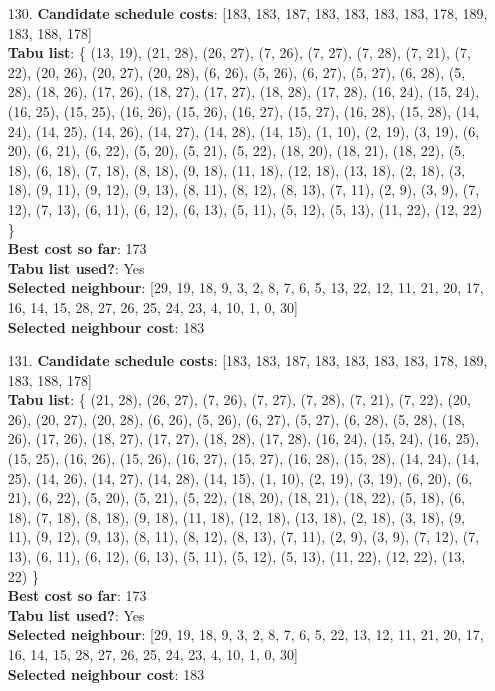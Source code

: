 \documentclass[fleqn]{article}
\begin{document}
\begin{itemize}
    \item[130.] \textbf{Candidate schedule costs}: [183, 183, 187, 183, 183, 183, 183, 178, 189, 183, 188, 178] \\
    \textbf{Tabu list}: \{ (13, 19), (21, 28), (26, 27), (7, 26), (7, 27), (7, 28), (7, 21), (7, 22), (20, 26), (20, 27), (20, 28), (6, 26), (5, 26), (6, 27), (5, 27), (6, 28), (5, 28), (18, 26), (17, 26), (18, 27), (17, 27), (18, 28), (17, 28), (16, 24), (15, 24), (16, 25), (15, 25), (16, 26), (15, 26), (16, 27), (15, 27), (16, 28), (15, 28), (14, 24), (14, 25), (14, 26), (14, 27), (14, 28), (14, 15), (1, 10), (2, 19), (3, 19), (6, 20), (6, 21), (6, 22), (5, 20), (5, 21), (5, 22), (18, 20), (18, 21), (18, 22), (5, 18), (6, 18), (7, 18), (8, 18), (9, 18), (11, 18), (12, 18), (13, 18), (2, 18), (3, 18), (9, 11), (9, 12), (9, 13), (8, 11), (8, 12), (8, 13), (7, 11), (2, 9), (3, 9), (7, 12), (7, 13), (6, 11), (6, 12), (6, 13), (5, 11), (5, 12), (5, 13), (11, 22), (12, 22) \} \\
    \textbf{Best cost so far}: 173 \\
    \textbf{Tabu list used?}: Yes \\
    \textbf{Selected neighbour}: [29, 19, 18, 9, 3, 2, 8, 7, 6, 5, 13, 22, 12, 11, 21, 20, 17, 16, 14, 15, 28, 27, 26, 25, 24, 23, 4, 10, 1, 0, 30] \\
    \textbf{Selected neighbour cost}: 183
      

    \item[131.] \textbf{Candidate schedule costs}: [183, 183, 187, 183, 183, 183, 183, 178, 189, 183, 188, 178] \\
    \textbf{Tabu list}: \{ (21, 28), (26, 27), (7, 26), (7, 27), (7, 28), (7, 21), (7, 22), (20, 26), (20, 27), (20, 28), (6, 26), (5, 26), (6, 27), (5, 27), (6, 28), (5, 28), (18, 26), (17, 26), (18, 27), (17, 27), (18, 28), (17, 28), (16, 24), (15, 24), (16, 25), (15, 25), (16, 26), (15, 26), (16, 27), (15, 27), (16, 28), (15, 28), (14, 24), (14, 25), (14, 26), (14, 27), (14, 28), (14, 15), (1, 10), (2, 19), (3, 19), (6, 20), (6, 21), (6, 22), (5, 20), (5, 21), (5, 22), (18, 20), (18, 21), (18, 22), (5, 18), (6, 18), (7, 18), (8, 18), (9, 18), (11, 18), (12, 18), (13, 18), (2, 18), (3, 18), (9, 11), (9, 12), (9, 13), (8, 11), (8, 12), (8, 13), (7, 11), (2, 9), (3, 9), (7, 12), (7, 13), (6, 11), (6, 12), (6, 13), (5, 11), (5, 12), (5, 13), (11, 22), (12, 22), (13, 22) \} \\
    \textbf{Best cost so far}: 173 \\
    \textbf{Tabu list used?}: Yes \\
    \textbf{Selected neighbour}: [29, 19, 18, 9, 3, 2, 8, 7, 6, 5, 22, 13, 12, 11, 21, 20, 17, 16, 14, 15, 28, 27, 26, 25, 24, 23, 4, 10, 1, 0, 30] \\
    \textbf{Selected neighbour cost}: 183
      


\end{itemize}
\end{document}

